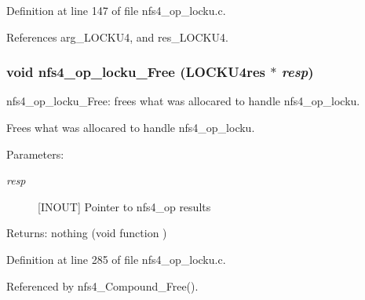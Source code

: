 Definition at line 147 of file nfs4\_\-op\_\-locku.c.

References arg\_\-LOCKU4, and res\_\-LOCKU4.
\subsubsection{\setlength{\rightskip}{0pt plus 5cm}void nfs4\_\-op\_\-locku\_\-Free (LOCKU4res $\ast$ {\em resp})}\label{nfs4__op__locku_8c_a3}


nfs4\_\-op\_\-locku\_\-Free: frees what was allocared to handle nfs4\_\-op\_\-locku.

Frees what was allocared to handle nfs4\_\-op\_\-locku.

\begin{Desc}
\item[Parameters:]
\begin{description}
\item[{\em resp}][INOUT] Pointer to nfs4\_\-op results\end{description}
\end{Desc}
\begin{Desc}
\item[Returns:]nothing (void function ) \end{Desc}


Definition at line 285 of file nfs4\_\-op\_\-locku.c.

Referenced by nfs4\_\-Compound\_\-Free().